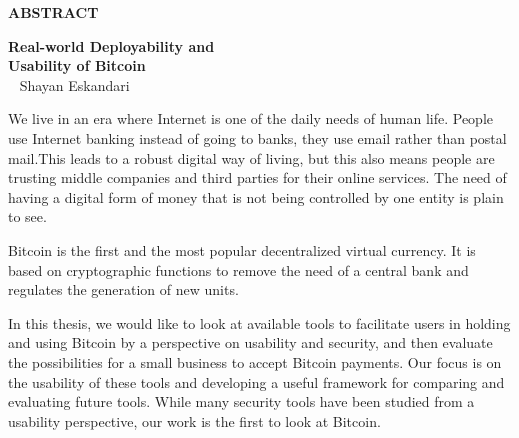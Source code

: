 
\setcounter{page}{3}
\vspace*{0.5cm}
\begin{center}
{\bf ABSTRACT}
\end{center}
\begin{center}
{\bf Real-world Deployability and}\\
{\bf Usability of Bitcoin}\\\
\vspace*{1mm}
Shayan Eskandari
\end{center}

We live in an era where Internet is one of the daily needs of human life. People use Internet banking instead of going to banks, they use email rather than postal mail.This leads to a robust digital way of living, but this also means people are trusting middle companies and third parties for their online services. The need of having a digital form of money that is not being controlled by one entity is plain to see.

Bitcoin is the first and the most popular decentralized virtual currency. It is based on cryptographic functions to remove the need of a central bank and regulates the generation of new units. 

In this thesis, we would like to look at available tools to facilitate users in holding and using Bitcoin by a perspective on usability and security, and then evaluate the possibilities for a small business to accept Bitcoin payments. Our focus is on the usability of these tools and developing a useful framework for comparing and evaluating future tools. While many security tools have been studied from a usability perspective, our work is the first to look at Bitcoin.